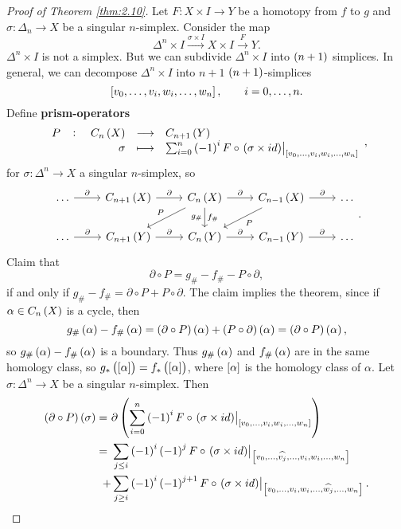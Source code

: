 \begin{proof}[Proof of Theorem \ref{thm:2.10}]
Let $ F : X \times I \to Y $ be a homotopy from $ f $ to $ g $ and $ \sigma : \Delta_n \to X $ be a singular $ n $-simplex. Consider the map
$$ \Delta^n \times I \xrightarrow{\sigma \times I} X \times I \xrightarrow{F} Y. $$
$ \Delta^n \times I $ is not a simplex. But we can subdivide $ \Delta^n \times I $ into $ \br{n + 1} $ simplices. In general, we can decompose $ \Delta^n \times I $ into $ n + 1 $ $ \br{n + 1} $-simplices
$$ \sbr{v_0, \dots, v_i, w_i, \dots, w_n}, \qquad i = 0, \dots, n. $$
Define \textbf{prism-operators}
$$ \function[P]{C_n\br{X}}{C_{n + 1}\br{Y}}{\sigma}{\sum_{i = 0}^n \br{-1}^iF \circ \eval{\br{\sigma \times id}}_{\sbr{v_0, \dots, v_i, w_i, \dots, w_n}}}, $$
for $ \sigma : \Delta^n \to X $ a singular $ n $-simplex, so
$$
\begin{tikzcd}
\dots \arrow{r}{\partial} & C_{n + 1}\br{X} \arrow{r}{\partial} & C_n\br{X} \arrow{r}{\partial} \arrow[swap]{dl}{P} \arrow{d}{f_\#}[swap]{g_\#} & C_{n - 1}\br{X} \arrow{r}{\partial} \arrow{dl}{P} & \dots \\
\dots \arrow{r}{\partial} & C_{n + 1}\br{Y} \arrow{r}{\partial} & C_n\br{Y} \arrow{r}{\partial} & C_{n - 1}\br{Y} \arrow{r}{\partial} & \dots
\end{tikzcd}.
$$
Claim that
$$ \partial \circ P = g_\# - f_\# - P \circ \partial, $$
if and only if $ g_\# - f_\# = \partial \circ P + P \circ \partial $. The claim implies the theorem, since if $ \alpha \in C_n\br{X} $ is a cycle, then
$$ g_\#\br{\alpha} - f_\#\br{\alpha} = \br{\partial \circ P}\br{\alpha} + \br{P \circ \partial}\br{\alpha} = \br{\partial \circ P}\br{\alpha}, $$
so $ g_\#\br{\alpha} - f_\#\br{\alpha} $ is a boundary. Thus $ g_\#\br{\alpha} $ and $ f_\#\br{\alpha} $ are in the same homology class, so $ g_*\br{\sbr{\alpha}} = f_*\br{\sbr{\alpha}} $, where $ \sbr{\alpha} $ is the homology class of $ \alpha $. Let $ \sigma : \Delta^n \to X $ be a singular $ n $-simplex. Then
\begin{align*}
\br{\partial \circ P}\br{\sigma}
= \ & \partial\br{\sum_{i = 0}^n \br{-1}^iF \circ \eval{\br{\sigma \times id}}_{\sbr{v_0, \dots, v_i, w_i, \dots, w_n}}} \\
= \ & \sum_{j \le i} \br{-1}^i\br{-1}^jF \circ \eval{\br{\sigma \times id}}_{\sbr{v_0, \dots, \widehat{v_j}, \dots, v_i, w_i, \dots, w_n}} \\
+ & \sum_{j \ge i} \br{-1}^i\br{-1}^{j + 1}F \circ \eval{\br{\sigma \times id}}_{\sbr{v_0, \dots, v_i, w_i, \dots, \widehat{w_j}, \dots, w_n}}.

\end{align*}
\end{proof}
